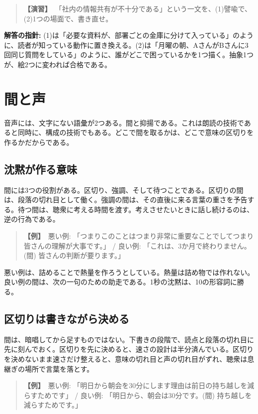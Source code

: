 \documentclass{article}
\begin{document}
\begin{quote}
\textbf{【演習】}\ 「社内の情報共有が不十分である」という一文を、(1)譬喩で、(2)1つの場面で、書き直せ。
\end{quote}

\textbf{解答の指針:} (1)は「必要な資料が、部署ごとの金庫に分けて入っている」のように、読者が知っている動作に置き換える。(2)は「月曜の朝、AさんがBさんに3回同じ質問をしている」のように、誰がどこで困っているかを1つ描く。抽象1つが、絵2つに変われば合格である。

\section{間と声}

音声には、文字にない語彙が2つある。間と抑揚である。これは朗読の技術であると同時に、構成の技術でもある。どこで間を取るかは、どこで意味の区切りを作るかだからである。

\subsection{沈黙が作る意味}

間には3つの役割がある。区切り、強調、そして待つことである。区切りの間は、段落の切れ目として働く。強調の間は、その直後に来る言葉の重さを予告する。待つ間は、聴衆に考える時間を渡す。考えさせたいときに話し続けるのは、逆の行為である。

\begin{quote}
\textbf{【例】}\ 悪い例: 「つまりこのことはつまり非常に重要なことでしてつまり皆さんの理解が大事です。」 / 良い例: 「これは、3か月で終わりません。(間) 皆さんの判断が要ります。」
\end{quote}

悪い例は、詰めることで熱量を作ろうとしている。熱量は詰め物では作れない。良い例の間は、次の一句のための助走である。1秒の沈黙は、10の形容詞に勝る。

\subsection{区切りは書きながら決める}

間は、暗唱してから足すものではない。下書きの段階で、読点と段落の切れ目に先に刻んでおく。区切りを先に決めると、速さの設計は半分済んでいる。区切りを決めないまま速さだけ整えると、意味の切れ目と声の切れ目がずれ、聴衆は息継ぎの場所で言葉を落とす。

\begin{quote}
\textbf{【例】}\ 悪い例: 「明日から朝会を30分にします理由は前日の持ち越しを減らすためです」 / 良い例: 「明日から、朝会は30分です。(間) 持ち越しを減らすためです。」
\end{quote}
\end{document}
